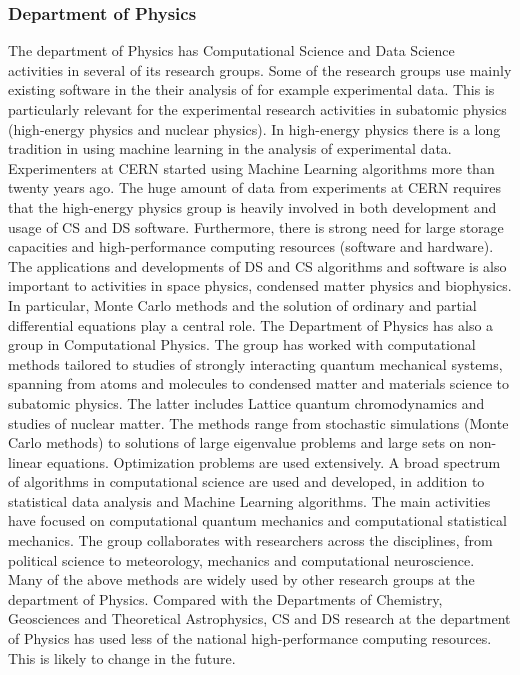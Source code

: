 \documentclass[a4paper,10pt]{article}
\begin{document}
\subsubsection*{Department of Physics}

The department of Physics has Computational Science and Data Science
activities in several of its research groups. Some of the research
groups use mainly existing software in the their analysis of for
example experimental data. This is particularly relevant for the
experimental research activities in subatomic physics (high-energy
physics and nuclear physics). In high-energy physics there is a long
tradition in using machine learning in the analysis of experimental
data. Experimenters at CERN started using Machine Learning algorithms
more than twenty years ago. The huge amount of data from experiments
at CERN requires that the high-energy physics group is heavily
involved in both development and usage of CS and DS
software. Furthermore, there is strong need for large storage
capacities and high-performance computing resources (software and
hardware).  The applications and developments of DS and CS algorithms
and software is also important to activities in space physics,
condensed matter physics and biophysics. In particular, Monte Carlo
methods and the solution of ordinary and partial differential
equations play a central role.  The Department of Physics has also a
group in Computational Physics. The group has worked with
computational methods tailored to studies of strongly interacting
quantum mechanical systems, spanning from atoms and molecules to
condensed matter and materials science to subatomic physics. The
latter includes Lattice quantum chromodynamics and studies of nuclear
matter. The methods range from stochastic simulations (Monte Carlo
methods) to solutions of large eigenvalue problems and large sets on
non-linear equations. Optimization problems are used extensively. A
broad spectrum of algorithms in computational science are used and
developed, in addition to statistical data analysis and Machine
Learning algorithms. The main activities have focused on computational
quantum mechanics and computational statistical mechanics. The group
collaborates with researchers across the disciplines, from political
science to meteorology, mechanics and computational neuroscience.
Many of the above methods are widely used by other research groups at
the department of Physics. Compared with the Departments of Chemistry,
Geosciences and Theoretical Astrophysics, CS and DS research at the
department of Physics has used less of the national high-performance
computing resources. This is likely to change in the future.
\end{document}
